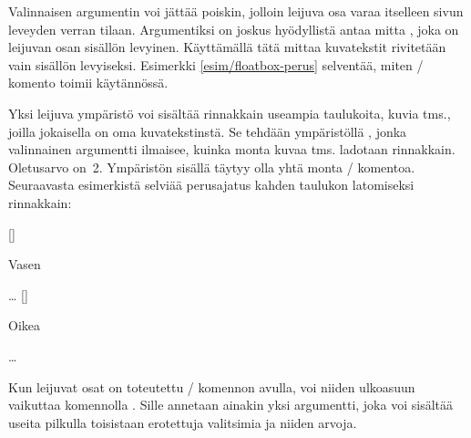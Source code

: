\noindent
Valinnaisen argumentin  voi jättää poiskin, jolloin
leijuva osa varaa itselleen sivun leveyden verran tilaan. Argumentiksi
on joskus hyödyllistä antaa mitta , joka on leijuvan osan
sisällön levyinen. Käyttämällä tätä mittaa kuvatekstit rivitetään vain
sisällön levyiseksi. Esimerkki \ref{esim/floatbox-perus} selventää,
miten \-/ komento toimii käytännössä.

Yksi leijuva ympäristö voi sisältää rinnakkain useampia taulukoita,
kuvia tms., joilla jokaisella on oma kuvatekstinstä. Se tehdään
ympäristöllä , jonka valinnainen argumentti
ilmaisee, kuinka monta kuvaa tms. ladotaan rinnakkain. Oletusarvo on~2.
Ympäristön sisällä täytyy olla yhtä monta \-/
komentoa. Seuraavasta esimerkistä selviää perusajatus kahden taulukon
latomiseksi rinnakkain:

\begin{koodilohkosis}
\begin{table}
  \begin{floatrow}[2]  %
    [\FBwidth]{\caption{Vasen}}{…}
    [\FBwidth]{\caption{Oikea}}{…}
  \end{floatrow}
\end{table}
\end{koodilohkosis}

\noindent
Kun leijuvat osat on toteutettu \-/ komennon avulla,
voi niiden ulkoasuun vaikuttaa komennolla . Sille
annetaan ainakin yksi argumentti, joka voi sisältää useita pilkulla
toisistaan erotettuja valitsimia ja niiden arvoja.

\begin{koodilohkosis}
\end{koodilohkosis}

